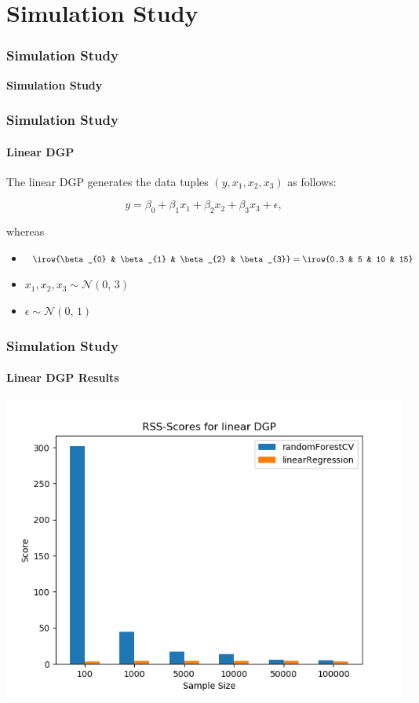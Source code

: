 

\section{Simulation Study}
\frametitle{Simulation Study}
\begin{frame}
    \begin{center}
        \textbf{Simulation Study}
    \end{center}
\end{frame}

\begin{frame}
    \frametitle{Simulation Study}
    \framesubtitle{Linear DGP}
    The linear DGP generates the data tuples \( (y, x_{1}, x_{2}, x_{3}) \) as follows:

    \begin{equation}\label{eq:linear_dgp}
        y = \beta_{0} + \beta_{1} x_{1} + \beta_{2} x_{2} + \beta_{3} x_{3} + \epsilon,
    \end{equation}
    
    whereas
    \begin{itemize}
        \item $ \irow{\beta_{0} & \beta_{1} & \beta_{2} & \beta_{3}} = \irow{0.3 & 5 & 10 & 15}$
        \item $x_{1}, x_{2}, x_{3} \sim \mathcal{N}(0,\,3)$
        \item $\epsilon \sim \mathcal{N}(0,\,1)$
    \end{itemize}
\end{frame}

\begin{frame}
    \frametitle{Simulation Study}
    \framesubtitle{Linear DGP Results}
	\begin{center}		
		\includegraphics[height=0.7\textheight]{images/forest_vs_ols_linearDGP.png}
	\end{center}
\end{frame}


